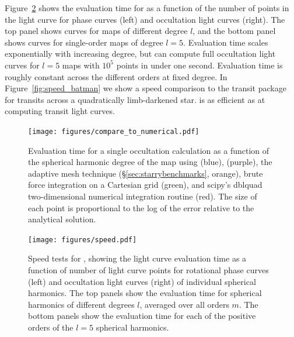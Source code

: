 \documentclass[modern]{aastex61}
\begin{document}
Figure~\ref{fig:speed} shows the evaluation time for \starry
as a function of the number of points in the light curve for phase curves
(left) and occultation light curves (right). The top panel shows curves for
maps of different degree $l$, and the bottom panel shows curves for single-order
maps of degree $l = 5$. Evaluation time scales exponentially with increasing
degree, but \starry can compute full occultation light curves for $l = 5$ maps
with $10^5$ points in under one second. Evaluation time is roughly constant
across the different orders at fixed degree.
In Figure~\ref{fig:speed_batman} we show a speed comparison
to the \batman transit package \citep{Kreidberg2015} for transits across a
quadratically limb-darkened star. \starry is as efficient as \batman at
computing transit light curves.

\begin{figure}[ht!]
    \begin{centering}
    \texttt{[image: figures/compare\_to\_numerical.pdf]}
    \caption{\label{fig:compare_to_numerical}
             Evaluation time for a single occultation calculation as a function
             of the spherical harmonic degree of the map using
             \starry (blue), \starrygrad (purple), the adaptive mesh technique (\S\ref{sec:starrybenchmarks}, orange),
             brute force integration on a Cartesian grid (green), and
             \textsf{scipy}'s \textsf{dblquad} two-dimensional numerical
             integration routine (red).
             The size of each point is proportional to the log of the error relative
             to the \starry analytical solution.
             }
    \end{centering}
\end{figure}

\begin{figure}[p!]
    \begin{centering}
    \texttt{[image: figures/speed.pdf]}
    \caption{\label{fig:speed}
             Speed tests for \starry, showing the light curve evaluation time
             as a function of number of light curve points for rotational
             phase curves (left) and occultation light curves (right) of individual
             spherical harmonics. The top
             panels show the evaluation time for spherical harmonics of different
             degrees $l$, averaged over all orders $m$. The bottom panels
             show the evaluation time for each of the positive orders
             of the $l = 5$ spherical harmonics.
             }
    \end{centering}
\end{figure}
\end{document}
